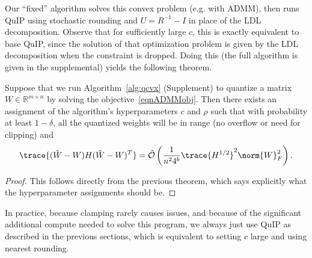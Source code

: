 Our ``fixed'' algorithm solves this convex problem (e.g. with ADMM), then runs QuIP using stochastic rounding and $U = R^{-1} - I$ in place of the LDL decomposition. Observe that for sufficiently large $c$, this is exactly equivalent to base QuIP, since the solution of that optimization problem is given by the LDL decomposition when the constraint is dropped. Doing this (the full algorithm is given in the supplemental) yields the following theorem.

\begin{theoremrep}
Suppose that we run Algorithm~\ref{alg:qcvx} (Supplement) to quantize a matrix $W \in \mathbb{R}^{m \times n}$ by solving the objective~\eqref{eqnADMMobj}. Then there exists an assignment of the algorithm's hyperparameters $c$ and $\rho$ such that with probability at least $1 - \delta$, all the quantized weights will be in range (no overflow or need for clipping) and
\[
	\trace{ (\hat W - W) H (\hat W - W)^T }
	=
	\tilde{\mathcal{O}}\left( \frac{1}{n^2 4^b} \trace{H^{1/2}}^2 \norm{W}_{F}^2 \right).
\]
\end{theoremrep}
\begin{proof}
This follows directly from the previous theorem, which says explicitly what the hyperparameter assignments should be.
\end{proof}

In practice, because clamping rarely causes issues, and because of the significant additional compute needed to solve this program, we always just use QuIP as described in the previous sections, which is equivalent to setting $c$ large and using nearest rounding.


